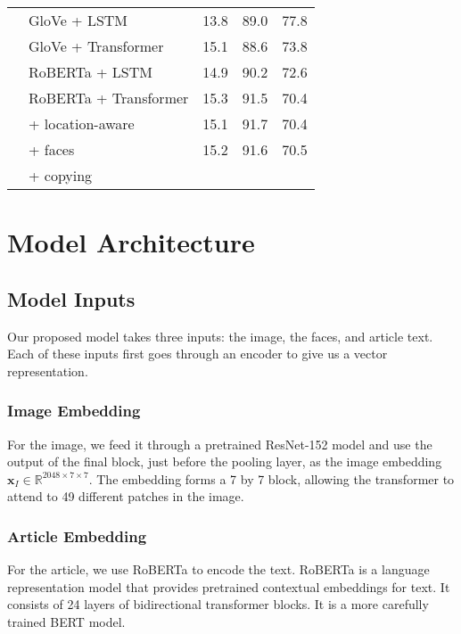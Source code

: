 \documentclass[10pt,twocolumn,letterpaper]{article}
\begin{document}
\begin{table}[t]
\begin{tabularx}{\linewidth}{llXXX}
      & GloVe + LSTM  & 13.8 & 89.0 & 77.8 \\
      & GloVe + Transformer  & 15.1 & 88.6 & 73.8 \\
      & RoBERTa + LSTM  & 14.9 & 90.2 & 72.6 \\
      & RoBERTa + Transformer  & 15.3 & 91.5 & 70.4 \\
      & \quad + location-aware & 15.1 & 91.7 & 70.4  \\
      & \quad\quad + faces & 15.2 & 91.6 & 70.5 \\
      & \quad\quad\quad + copying \\
		\bottomrule
	\end{tabularx}
\end{table}



\section{Model Architecture}

\subsection{Model Inputs}

Our proposed model takes three inputs: the image, the faces, and article text.
Each of these inputs first goes through an encoder to give us a vector
representation.

\subsubsection{Image Embedding}

For the image, we feed it through a pretrained ResNet-152 model
\cite{He2016ResNet} and use the output of the final block, just before the
pooling layer, as the image embedding $\bm{x}_I \in \mathbb{R}^{2048 \times 7
\times 7}$. The embedding forms a 7 by 7 block, allowing the transformer to
attend to 49 different patches in the image.

\subsubsection{Article Embedding}

For the article, we use RoBERTa \cite{Liu2019RoBERTaAR} to encode the text.
RoBERTa is a language representation model that provides pretrained contextual
embeddings for text. It consists of 24 layers of bidirectional transformer
blocks. It is a more carefully trained BERT \cite{Devlin2019BERT} model.
\end{document}
